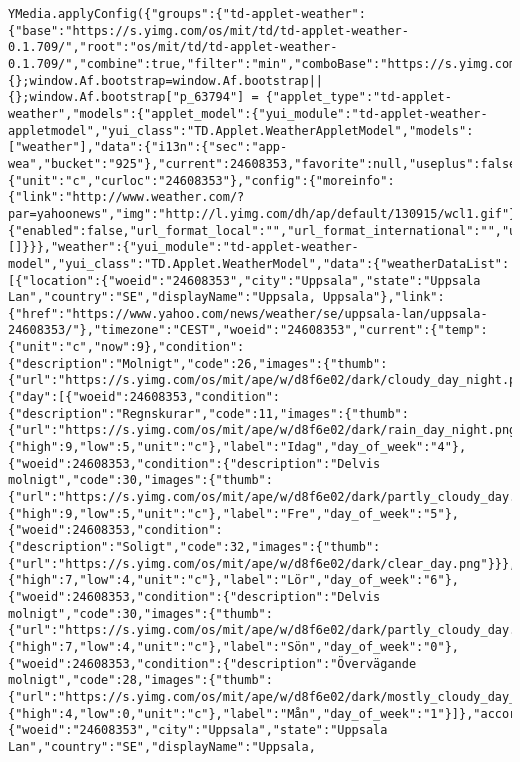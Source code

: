 \begin{verbatim}
YMedia.applyConfig({"groups":{"td-applet-weather":{"base":"https://s.yimg.com/os/mit/td/td-applet-weather-0.1.709/","root":"os/mit/td/td-applet-weather-0.1.709/","combine":true,"filter":"min","comboBase":"https://s.yimg.com/zz/combo?","comboSep":"&"}}});window.Af=window.Af||{};window.Af.bootstrap=window.Af.bootstrap||{};window.Af.bootstrap["p_63794"] = {"applet_type":"td-applet-weather","models":{"applet_model":{"yui_module":"td-applet-weather-appletmodel","yui_class":"TD.Applet.WeatherAppletModel","models":["weather"],"data":{"i13n":{"sec":"app-wea","bucket":"925"},"current":24608353,"favorite":null,"useplus":false},"user_settings":{"unit":"c","curloc":"24608353"},"config":{"moreinfo":{"link":"http://www.weather.com/?par=yahoonews","img":"http://l.yimg.com/dh/ap/default/130915/wcl1.gif"},"enableFav":false,"enableWeatherYQLP":true,"baseLink":"https://www.yahoo.com/news/weather","showWidgetLink":true,"urlGeneratorRules":{"enabled":false,"url_format_local":"","url_format_international":"","url_format_local_ajax":"","local_country_code":[]}}},"weather":{"yui_module":"td-applet-weather-model","yui_class":"TD.Applet.WeatherModel","data":{"weatherDataList":[{"location":{"woeid":"24608353","city":"Uppsala","state":"Uppsala Lan","country":"SE","displayName":"Uppsala, Uppsala"},"link":{"href":"https://www.yahoo.com/news/weather/se/uppsala-lan/uppsala-24608353/"},"timezone":"CEST","woeid":"24608353","current":{"temp":{"unit":"c","now":9},"condition":{"description":"Molnigt","code":26,"images":{"thumb":{"url":"https://s.yimg.com/os/mit/ape/w/d8f6e02/dark/cloudy_day_night.png"}}}},"forecast":{"day":[{"woeid":24608353,"condition":{"description":"Regnskurar","code":11,"images":{"thumb":{"url":"https://s.yimg.com/os/mit/ape/w/d8f6e02/dark/rain_day_night.png"}}},"timezone":"Europe/Stockholm","temp":{"high":9,"low":5,"unit":"c"},"label":"Idag","day_of_week":"4"},{"woeid":24608353,"condition":{"description":"Delvis molnigt","code":30,"images":{"thumb":{"url":"https://s.yimg.com/os/mit/ape/w/d8f6e02/dark/partly_cloudy_day.png"}}},"timezone":"Europe/Stockholm","temp":{"high":9,"low":5,"unit":"c"},"label":"Fre","day_of_week":"5"},{"woeid":24608353,"condition":{"description":"Soligt","code":32,"images":{"thumb":{"url":"https://s.yimg.com/os/mit/ape/w/d8f6e02/dark/clear_day.png"}}},"timezone":"Europe/Stockholm","temp":{"high":7,"low":4,"unit":"c"},"label":"Lör","day_of_week":"6"},{"woeid":24608353,"condition":{"description":"Delvis molnigt","code":30,"images":{"thumb":{"url":"https://s.yimg.com/os/mit/ape/w/d8f6e02/dark/partly_cloudy_day.png"}}},"timezone":"Europe/Stockholm","temp":{"high":7,"low":4,"unit":"c"},"label":"Sön","day_of_week":"0"},{"woeid":24608353,"condition":{"description":"Övervägande molnigt","code":28,"images":{"thumb":{"url":"https://s.yimg.com/os/mit/ape/w/d8f6e02/dark/mostly_cloudy_day_night.png"}}},"timezone":"Europe/Stockholm","temp":{"high":4,"low":0,"unit":"c"},"label":"Mån","day_of_week":"1"}]},"accordianState":"e"}],"currentLoc":{"woeid":"24608353","city":"Uppsala","state":"Uppsala Lan","country":"SE","displayName":"Uppsala, 
\end{verbatim}
